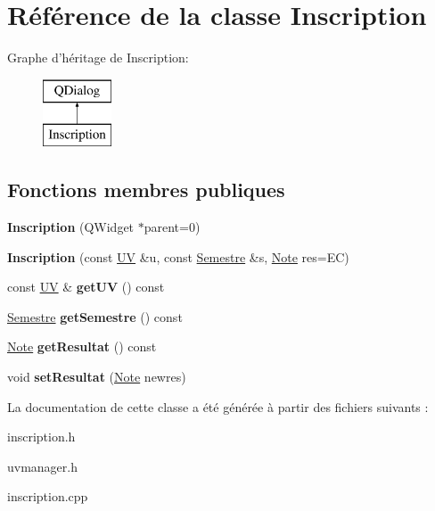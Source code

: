 \hypertarget{class_inscription}{\section{Référence de la classe Inscription}
\label{class_inscription}
}
Graphe d'héritage de Inscription\+:\begin{figure}[H]
\begin{center}
\leavevmode
\includegraphics[height=2.000000cm]{class_inscription}
\end{center}
\end{figure}
\subsection*{Fonctions membres publiques}
\begin{DoxyCompactItemize}
\item 
\hypertarget{class_inscription_a608f9a8a73afa7fd640eb6c9e1dd0c64}{{\bfseries Inscription} (Q\+Widget $\ast$parent=0)}\label{class_inscription_a608f9a8a73afa7fd640eb6c9e1dd0c64}

\item 
\hypertarget{class_inscription_ae5813a1c17301c0c3638fc8c67558eb4}{{\bfseries Inscription} (const \hyperlink{class_u_v}{U\+V} \&u, const \hyperlink{class_semestre}{Semestre} \&s, \hyperlink{class_note}{Note} res=E\+C)}\label{class_inscription_ae5813a1c17301c0c3638fc8c67558eb4}

\item 
\hypertarget{class_inscription_a02c7a282ebfc86a0f11989965d5f6b46}{const \hyperlink{class_u_v}{U\+V} \& {\bfseries get\+U\+V} () const }\label{class_inscription_a02c7a282ebfc86a0f11989965d5f6b46}

\item 
\hypertarget{class_inscription_a04fc765bec80a60f65f07af72de90ea7}{\hyperlink{class_semestre}{Semestre} {\bfseries get\+Semestre} () const }\label{class_inscription_a04fc765bec80a60f65f07af72de90ea7}

\item 
\hypertarget{class_inscription_a71bda789e8159491e35b924a59b4175b}{\hyperlink{class_note}{Note} {\bfseries get\+Resultat} () const }\label{class_inscription_a71bda789e8159491e35b924a59b4175b}

\item 
\hypertarget{class_inscription_a7236d5c2ea9bfc08d01bdfdb8ed851ec}{void {\bfseries set\+Resultat} (\hyperlink{class_note}{Note} newres)}\label{class_inscription_a7236d5c2ea9bfc08d01bdfdb8ed851ec}

\end{DoxyCompactItemize}


La documentation de cette classe a été générée à partir des fichiers suivants \+:\begin{DoxyCompactItemize}
\item 
inscription.\+h\item 
uvmanager.\+h\item 
inscription.\+cpp\end{DoxyCompactItemize}
